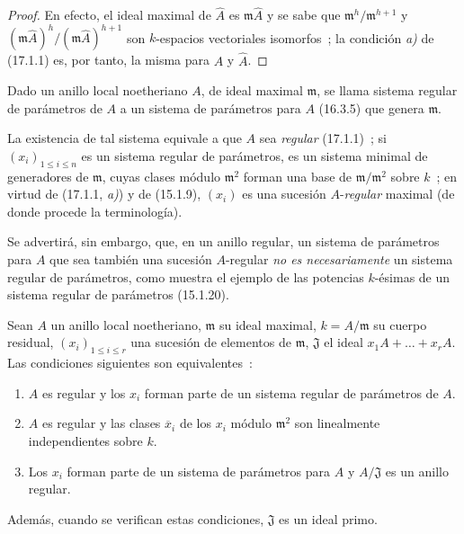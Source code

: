 \begin{proof}
En efecto, el ideal maximal de $\widehat{A}$ es $\mathfrak{m}\widehat{A}$ y se
sabe que $\mathfrak{m}^h/\mathfrak{m}^{h+1}$ y
$(\mathfrak{m}\widehat{A})^h/(\mathfrak{m}\widehat{A})^{h+1}$ son
$k$-espacios vectoriales isomorfos~; la condición \emph{a)} de (17.1.1) es, por tanto, la
misma para $A$ y $\widehat{A}$.
\end{proof}

\begin{definition}[17.1.6]
\label{0.17.1.6-fr}
Dado un anillo local noetheriano $A$, de ideal maximal $\mathfrak{m}$, se
llama sistema regular de parámetros de $A$ a un sistema de parámetros
para $A$ \textup{(16.3.5)} que genera $\mathfrak{m}$.
\end{definition}

La existencia de tal sistema equivale a que $A$ sea \emph{regular} (17.1.1)~;
si $(x_i)_{1\leq i\leq n}$ es un sistema regular de parámetros, es un
sistema minimal de generadores de $\mathfrak{m}$, cuyas clases módulo
$\mathfrak{m}^2$ forman una base de $\mathfrak{m}/\mathfrak{m}^2$ sobre $k$~;
en virtud de (17.1.1, \emph{a)}) y de (15.1.9), $(x_i)$ es una sucesión $A$-\emph{regular}
maximal (de donde procede la terminología).

Se advertirá, sin embargo, que, en un anillo regular, un sistema de
parámetros para $A$ que sea también una sucesión $A$-regular \emph{no es
necesariamente} un sistema regular de parámetros, como muestra el ejemplo
de las potencias $k$-ésimas de un sistema regular de parámetros (15.1.20).

\begin{proposition}[17.1.7]
\label{0.17.1.7-fr}
Sean $A$ un anillo local noetheriano, $\mathfrak{m}$ su ideal maximal,
$k=A/\mathfrak{m}$ su cuerpo residual, $(x_i)_{1\leq i\leq r}$ una sucesión
de elementos de $\mathfrak{m}$, $\mathfrak{J}$ el ideal
$x_1A+\ldots+x_rA$. Las condiciones siguientes son equivalentes~:
\begin{enumerate}
  \item[\rm a)] $A$ es regular y los $x_i$ forman parte de un sistema
  regular de parámetros de $A$.
  \item[\rm a')] $A$ es regular y las clases $\overline{x}_i$ de los $x_i$
  \textup{módulo} $\mathfrak{m}^2$ son linealmente independientes sobre $k$.
  \item[\rm b)] Los $x_i$ forman parte de un sistema de parámetros para $A$ y
  $A/\mathfrak{J}$ es un anillo regular.
\end{enumerate}
Además, cuando se verifican estas condiciones, $\mathfrak{J}$ es un ideal
primo.
\end{proposition}


